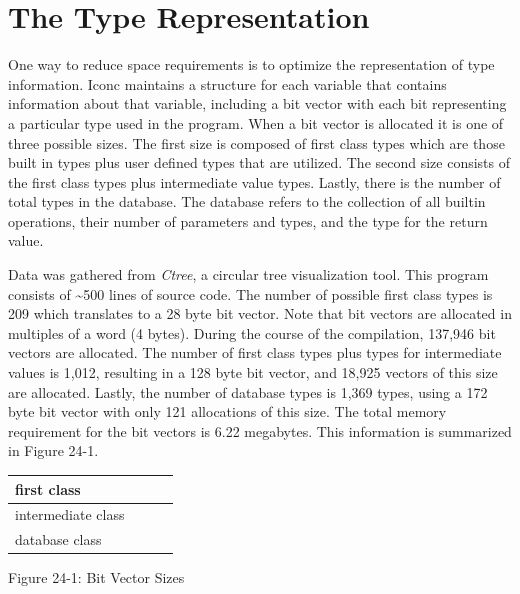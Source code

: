 \section{The Type Representation}

One way to reduce space requirements is to optimize the representation
of type information. Iconc maintains a structure for each variable
that contains information about that variable, including a bit vector
with each bit representing a particular type used in the program. When
a bit vector is allocated it is one of three possible sizes. The first
size is composed of first class types which are those built in types
plus user defined types that are utilized. The second size consists of
the first class types plus intermediate value types. Lastly, there is
the number of total types in the database. The database refers to the
collection of all builtin operations, their number of parameters and
types, and the type for the return value.

Data was gathered from \textit{Ctree}, a circular tree visualization
tool. This program consists of \~{}500 lines of source code. The
number of possible first class types is 209 which translates to a 28
byte bit vector. Note that bit vectors are allocated in multiples of a
word (4 bytes). During the course of the compilation, 137,946 bit
vectors are allocated. The number of first class types plus types for
intermediate values is 1,012, resulting in a 128 byte bit vector, and
18,925 vectors of this size are allocated. Lastly, the number of
database types is 1,369 types, using a 172 byte bit vector with only
121 allocations of this size. The total memory requirement for the bit
vectors is 6.22 megabytes. This information is summarized in Figure
24-1.

\begin{center}
\tabletail{}
\tablelasttail{}
\begin{xtabular}{|m{1.2191598in}|m{1.1629599in}|m{1.2455599in}|m{1.6080599in}|}
\hline
 first class &
 &
 &
\raggedleft{}\\\hline
 intermediate class &
 &
 &
\raggedleft{}\\\hline
 database class &
 &
 &
\raggedleft{}\\\hline
\end{xtabular}
\end{center}
{\centering{}
Figure 24-1: Bit Vector Sizes
\par}


